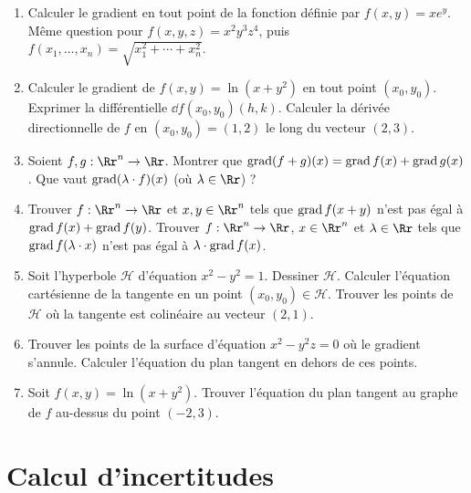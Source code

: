 \documentclass[11pt, class=report,crop=false]{standalone}
\begin{document}
\begin{miniexercices}
\sauteligne
\begin{enumerate}
  \item Calculer le gradient en tout point de la fonction définie par $f(x,y) = xe^y$. Même question pour $f(x,y,z) = x^2y^3z^4$, puis $f(x_1,\ldots,x_n)= \sqrt{x_1^2+\cdots+x_n^2}$. 
  
  \item  Calculer le gradient de $f(x,y) = \ln(x+y^2)$ en tout point $(x_0,y_0)$.
  Exprimer la différentielle $\dd f(x_0,y_0)(h,k)$. Calculer la dérivée directionnelle de $f$ en $(x_0,y_0)=(1,2)$ le long du vecteur $(2,3)$.
  
  \item Soient $f,g : \Rr^n \to \Rr$.
  Montrer que $\operatorname{grad} (f+g) (x) = \operatorname{grad} f(x) + \operatorname{grad} g(x)$. Que vaut $\operatorname{grad} (\lambda \cdot f) (x)$ (où $\lambda \in \Rr$) ?
  
  \item Trouver $f : \Rr^n \to \Rr$ et $x,y \in \Rr^n$ 
  tels que $\operatorname{grad} f (x+y)$ n'est pas égal à $\operatorname{grad} f (x) +\operatorname{grad} f (y)$.
  Trouver $f : \Rr^n \to \Rr$, $x \in \Rr^n$ et $\lambda \in \Rr$ tels que $\operatorname{grad} f (\lambda \cdot x)$ n'est pas égal à $\lambda \cdot \operatorname{grad} f (x)$.
     
  \item Soit l'hyperbole $\mathcal{H}$ d'équation $x^2-y^2=1$. Dessiner $\mathcal{H}$. Calculer l'équation cartésienne de la tangente en un point $(x_0,y_0) \in \mathcal{H}$. Trouver les points de $\mathcal{H}$ où la tangente est colinéaire au vecteur $(2,1)$.
   
  \item Trouver les points de la surface d'équation $x^2-y^2z=0$ où le gradient s'annule. Calculer l'équation du plan tangent en dehors de ces points.
  
  \item Soit $f(x,y) = \ln(x+y^2)$. Trouver l'équation du plan tangent au graphe de $f$ au-dessus du point $(-2,3)$.
  
   
  
\end{enumerate}
\end{miniexercices}



\section{Calcul d'incertitudes}
\end{document}
